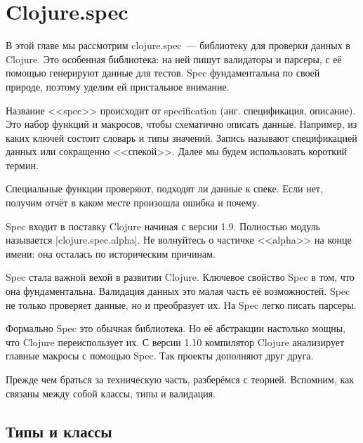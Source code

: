 \chapter{Clojure.spec}

\label{chapter-spec}


\begin{teaser}
В этой главе мы рассмотрим clojure.spec~--- библиотеку для проверки данных в
Clojure. Это особенная библиотека: на ней пишут валидаторы и парсеры, с е\"{е}
помощью генерируют данные для тестов. Spec фундаментальна по своей природе,
поэтому уделим ей пристальное внимание.
\end{teaser}

Название <<spec>> происходит от specification (анг. спецификация, описание). Это
набор функций и макросов, чтобы схематично описать данные. Например, из каких
ключей состоит словарь и типы значений. Запись называют спецификацией данных или
сокращенно <<спекой>>. Далее мы будем использовать короткий термин.

Специальные функции проверяют, подходят ли данные к спеке. Если нет, получим
отч\"{е}т в каком месте произошла ошибка и почему.


Spec входит в поставку Clojure начиная с версии 1.9. Полностью модуль называется
\spverb|clojure.spec.alpha|. Не волнуйтесь о частичке <<alpha>> на конце
имени: она осталась по историческим причинам.


Spec стала важной вехой в развитии Clojure. Ключевое свойство Spec в том, что
она фундаментальна. Валидация данных это малая часть е\"{е} возможностей. Spec
не только проверяет данные, но и преобразует их. На Spec легко писать парсеры.

Формально Spec это обычная библиотека. Но е\"{е} абстракции настолько мощны, что
Clojure переиспользует их. С версии 1.10 компилятор Clojure анализирует главные
макросы с помощью Spec. Так проекты дополняют друг друга.

Прежде чем браться за техническую часть, разбер\"{е}мся с теорией. Вспомним, как
связаны между собой классы, типы и валидация.

\section{Типы и классы}

